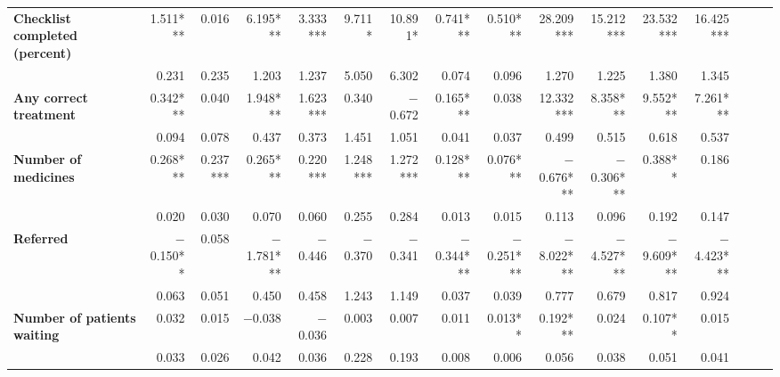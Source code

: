 \begin{tabular}{@{\extracolsep{5pt}}lrrrrrrrrrrrrrrr}
{\bf Checklist completed (percent)} & 1.511*** & 0.016\phantom{***} & 6.195*** & 3.333*** & 9.711*\phantom{**} & 10.891*\phantom{**} & 0.741*** & 0.510*** & 28.209*** & 15.212*** & 23.532*** & 16.425*** \\
{\bf } & 0.231\phantom{***} & 0.235\phantom{***} & 1.203\phantom{***} & 1.237\phantom{***} & 5.050\phantom{***} & 6.302\phantom{***} & 0.074\phantom{***} & 0.096\phantom{***} & 1.270\phantom{***} & 1.225\phantom{***} & 1.380\phantom{***} & 1.345\phantom{***} \\
{\bf Any correct treatment} & 0.342*** & 0.040\phantom{***} & 1.948*** & 1.623*** & 0.340\phantom{***} & $-$0.672\phantom{***} & 0.165*** & 0.038\phantom{***} & 12.332*** & 8.358*** & 9.552*** & 7.261*** \\
{\bf } & 0.094\phantom{***} & 0.078\phantom{***} & 0.437\phantom{***} & 0.373\phantom{***} & 1.451\phantom{***} & 1.051\phantom{***} & 0.041\phantom{***} & 0.037\phantom{***} & 0.499\phantom{***} & 0.515\phantom{***} & 0.618\phantom{***} & 0.537\phantom{***} \\
{\bf Number of medicines} & 0.268*** & 0.237*** & 0.265*** & 0.220*** & 1.248*** & 1.272*** & 0.128*** & 0.076*** & $-$0.676*** & $-$0.306*** & 0.388**\phantom{*} & 0.186\phantom{***} \\
{\bf } & 0.020\phantom{***} & 0.030\phantom{***} & 0.070\phantom{***} & 0.060\phantom{***} & 0.255\phantom{***} & 0.284\phantom{***} & 0.013\phantom{***} & 0.015\phantom{***} & 0.113\phantom{***} & 0.096\phantom{***} & 0.192\phantom{***} & 0.147\phantom{***} \\
{\bf Referred} & $-$0.150**\phantom{*} & 0.058\phantom{***} & $-$1.781*** & $-$0.446\phantom{***} & $-$0.370\phantom{***} & $-$0.341\phantom{***} & $-$0.344*** & $-$0.251*** & $-$8.022*** & $-$4.527*** & $-$9.609*** & $-$4.423*** \\
{\bf } & 0.063\phantom{***} & 0.051\phantom{***} & 0.450\phantom{***} & 0.458\phantom{***} & 1.243\phantom{***} & 1.149\phantom{***} & 0.037\phantom{***} & 0.039\phantom{***} & 0.777\phantom{***} & 0.679\phantom{***} & 0.817\phantom{***} & 0.924\phantom{***} \\
{\bf Number of patients waiting} & 0.032\phantom{***} & 0.015\phantom{***} & $-$0.038\phantom{***} & $-$0.036\phantom{***} & 0.003\phantom{***} & 0.007\phantom{***} & 0.011\phantom{***} & 0.013**\phantom{*} & 0.192*** & 0.024\phantom{***} & 0.107**\phantom{*} & 0.015\phantom{***} \\
{\bf } & 0.033\phantom{***} & 0.026\phantom{***} & 0.042\phantom{***} & 0.036\phantom{***} & 0.228\phantom{***} & 0.193\phantom{***} & 0.008\phantom{***} & 0.006\phantom{***} & 0.056\phantom{***} & 0.038\phantom{***} & 0.051\phantom{***} & 0.041\phantom{***} \\

\end{tabular}
